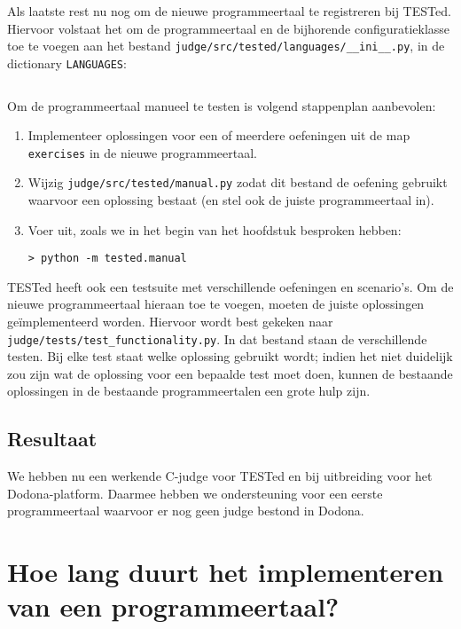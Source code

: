 Als laatste rest nu nog om de nieuwe programmeertaal te registreren bij TESTed.
Hiervoor volstaat het om de programmeertaal en de bijhorende configuratieklasse toe te voegen aan het bestand \texttt{judge/src/tested/languages/\_\_ini\_\_.py}, in de dictionary \texttt{LANGUAGES}:

\inputminted[firstline=17,lastline=23]{python}{sources/languages-init.py}

Om de programmeertaal manueel te testen is volgend stappenplan aanbevolen:

\begin{enumerate}
    \item Implementeer oplossingen voor een of meerdere oefeningen uit de map \texttt{exercises} in de nieuwe programmeertaal.
    \item Wijzig \texttt{judge/src/tested/manual.py} zodat dit bestand de oefening gebruikt waarvoor een oplossing bestaat (en stel ook de juiste programmeertaal in).
    \item Voer uit, zoals we in het begin van het hoofdstuk besproken hebben:
    
    \begin{verbatim}
> python -m tested.manual
    \end{verbatim}
\end{enumerate}

TESTed heeft ook een testsuite met verschillende oefeningen en scenario's.
Om de nieuwe programmeertaal hieraan toe te voegen, moeten de juiste oplossingen geïmplementeerd worden.
Hiervoor wordt best gekeken naar \texttt{judge/tests/test\_functionality.py}.
In dat bestand staan de verschillende testen.
Bij elke test staat welke oplossing gebruikt wordt;
indien het niet duidelijk zou zijn wat de oplossing voor een bepaalde test moet doen, kunnen de bestaande oplossingen in de bestaande programmeertalen een grote hulp zijn.

\subsection{Resultaat}\label{subsec:resultaat}

We hebben nu een werkende C-judge voor TESTed en bij uitbreiding voor het Dodona-platform.
Daarmee hebben we ondersteuning voor een eerste programmeertaal waarvoor er nog geen judge bestond in Dodona.


\section{Hoe lang duurt het implementeren van een programmeertaal?}\label{sec:hoe-lang-duurt-het-implementeren-van-een-programmeertaal?}

